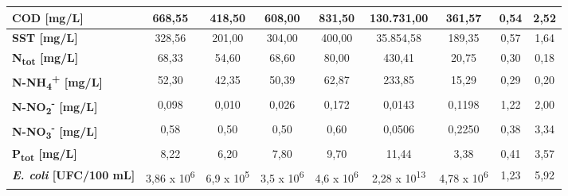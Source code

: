 \begin{sidewaystable}[h]
\begin{center}
\begin{tabular}{l|c|c|c|c|c|c|c|c|}
		\multicolumn{1}{|l|}{\textbf{COD {[}mg/L{]}}}           & 668,55                    & 418,50                     & 608,00                    & 831,50                    & 130.731,00                     & 361,57                      & 0,54                      & 2,52                      \\ \hline
		\multicolumn{1}{|l|}{\textbf{SST {[}mg/L{]}}}           & 328,56                    & 201,00                    & 304,00                    & 400,00                    & 35.854,58                   & 189,35                      & 0,57                      & 1,64                      \\ \hline
		\multicolumn{1}{|l|}{\textbf{N\textsubscript{tot} {[}mg/L{]}}}          & 68,33                     & 54,60                     & 68,60                     & 80,00                     & 430,41                      & 20,75                       & 0,30                      & 0,18                      \\ \hline
		\multicolumn{1}{|l|}{\textbf{N-NH\textsubscript{4}\textsuperscript{+} {[}mg/L{]}}}        & 52,30                     & 42,35                     & 50,39                     & 62,87                     & 233,85                      & 15,29                       & 0,29                      & 0,20                      \\ \hline
		\multicolumn{1}{|l|}{\textbf{N-NO\textsubscript{2}\textsuperscript{-} {[}mg/L{]}}}        & 0,098                     & 0,010                     & 0,026                     & 0,172                     & 0,0143                      & 0,1198                      & 1,22                      & 2,00                      \\ \hline
		\multicolumn{1}{|l|}{\textbf{N-NO\textsubscript{3}\textsuperscript{-} {[}mg/L{]}}}        & 0,58                      & 0,50                      & 0,50                      & 0,60                      & 0,0506                      & 0,2250                      & 0,38                      & 3,34                      \\ \hline
		\multicolumn{1}{|l|}{\textbf{P\textsubscript{tot} {[}mg/L{]}}}          & 8,22                      & 6,20                      & 7,80                      & 9,70                      & 11,44                       & 3,38                        & 0,41                      & 3,57                      \\ \hline
		\multicolumn{1}{|l|}{\textbf{\textit{E. coli} {[}UFC/100 mL{]}}} & 3,86 x 10\textsuperscript{6}                & 6,9 x 10\textsuperscript{5}                 & 3,5 x 10\textsuperscript{6}                 & 4,6 x 10\textsuperscript{6}                 & 2,28 x 10\textsuperscript{13}                 & 4,78 x 10\textsuperscript{6}                  & 1,23                      & 5,92                      \\ \hline
	

\end{tabular}
\end{center}
\end{sidewaystable}
